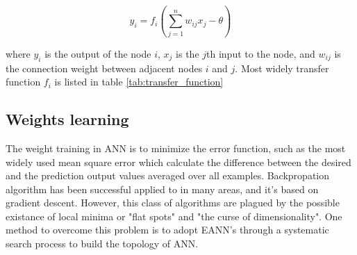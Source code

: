\begin{equation}
	y_i = f_i(\sum_{j=1}^n{w_{ij}x_j - \theta})
\end{equation}

where $y_i$ is the output of the node $i$, $x_j$ is the $j$th input to the node,
and $w_{ij}$ is the connection weight between adjacent nodes $i$ and $j$. Most
widely transfer function  $f_i$ is listed in table \ref{tab:transfer_function}



\subsection{Weights learning}
The weight training in ANN is to minimize the error function, such as the most
widely used mean square error which calculate the difference  between the
desired and the prediction output values averaged over all examples.
Backpropation algorithm has been successful applied to in many areas, and it's
based on gradient descent. However, this class of algorithms are  plagued by
the possible existance of local minima or "flat spots" and "the curse of
dimensionality". One method to overcome this problem is to adopt
EANN's\cite{yao1999evolving} through a systematic search process\cite{elsken2019neural} to build
the topology of ANN.







